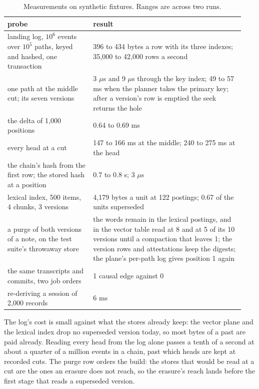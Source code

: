 \documentclass[11pt]{article}
\theoremstyle{plain}
\theoremstyle{definition}
\begin{document}
\begin{table}[t]
\centering
\small
\begin{tabular}{@{}p{0.34\linewidth}p{0.60\linewidth}@{}}
\toprule
probe & result \\
\midrule
landing log, $10^6$ events over $10^5$ paths, keyed and hashed, one transaction &
  396 to 434 bytes a row with its three indexes; 35{,}000 to 42{,}000 rows a second \\
one path at the middle cut; its seven versions & 3 $\mu$s and 9 $\mu$s through the key index;
  49 to 57 ms when the planner takes the primary key; after a version's row is emptied the
  seek returns the hole \\
the delta of 1{,}000 positions & 0.64 to 0.69 ms \\
every head at a cut & 147 to 166 ms at the middle; 240 to 275 ms at the head \\
the chain's hash from the first row; the stored hash at a position & 0.7 to 0.8 s; 3 $\mu$s \\
lexical index, 500 items, 4 chunks, 3 versions &
  4{,}179 bytes a unit at 122 postings; 0.67 of the units superseded \\
a purge of both versions of a note, on the test suite's throwaway store &
  the words remain in the lexical postings, and in the vector table read at 8 and at 5 of its 10
  versions until a compaction that leaves 1; the version rows and attestations keep the
  digests; the plane's per-path log gives position 1 again \\
the same transcripts and commits, two job orders & 1 causal edge against 0 \\
re-deriving a session of 2{,}000 records & 6 ms \\
\bottomrule
\end{tabular}
\caption{Measurements on synthetic fixtures. Ranges are across two runs.}\label{tab:measure}
\end{table}

The log's cost is small against what the stores already keep: the vector plane and the lexical
index drop no superseded version today, so most bytes of a past are paid already. Reading every
head from the log alone passes a tenth of a second at about a quarter of a million events in a
chain, past which heads are kept at recorded cuts. The purge row orders the build: the stores
that would be read at a cut are the ones an erasure does not reach, so the erasure's reach lands
before the first stage that reads a superseded version.
\end{document}
